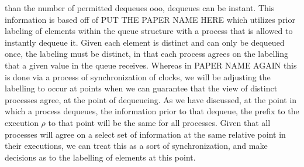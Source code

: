 \documentclass[a4paper,anonymous,USenglish]{lipics-v2021} %
\theoremstyle{definition}
\begin{document}
  than the number of permitted dequeues ooo, dequeues can be instant. This information is based off of PUT THE PAPER NAME HERE which utilizes prior labeling of elements within the queue structure with a process that is allowed to instantly dequeue it.  Given each element is distinct and can only be dequeued once, the labeling must be distinct, in that each process agrees on the labelling that a given value in the queue receives. Whereas in PAPER NAME AGAIN this is done via a process of synchronization of clocks, we will be adjusting the labelling to occur at points when we can guarantee that the view of distinct processes agree, at the point of dequeueing. As we have discussed, at the point in which a process dequeues, the information prior to that dequeue, the prefix to the execution $\rho$ to that point will be the same for all processes. Given that all processes will agree on a select set of information at the same relative point in their executions, we can treat this as a sort of synchronization, and make decisions as to the labelling of elements at this point.


\end{document}
